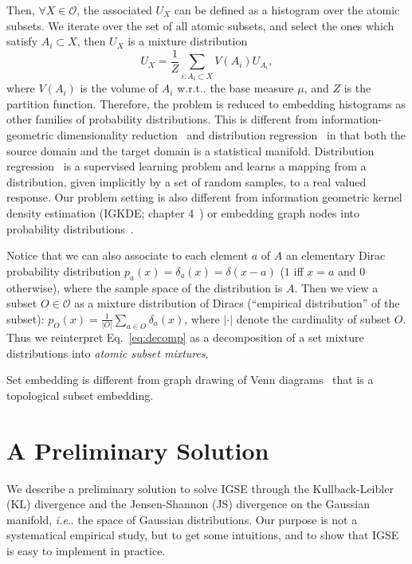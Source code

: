 \documentclass{article}
\makeatletter
\DeclareRobustCommand\onedot{\futurelet\@let@token\bmv@onedotaux}
\def\bmv@onedotaux{\ifx\@let@token.\else.\null\fi\xspace}
\def\ie{\emph{i.e}\onedot} \def\Ie{\emph{I.e}\onedot}
\def\wrt{w.r.t\onedot} \def\Wrt{W.r.t\onedot}
\makeatother
\begin{document}
Then, $\forall{X}\in\mathcal{O}$, the associated $U_X$ can be defined as
a histogram over the atomic subsets. We iterate over the set of all
atomic subsets, and select the ones which satisfy $A_i\subset{X}$,
then $U_X$ is a mixture distribution
\begin{equation}\label{eq:decomp}
U_{X} = \frac{1}{Z} \sum_{i:A_i\subset{X}} V(A_i) U_{A_i},
\end{equation}
where $V(A_i)$ is the volume of $A_i$ \wrt the base measure $\mu$,
and $Z$ is the partition function. Therefore, the problem is
reduced to embedding histograms as other families of probability distributions.
This is different from information-geometric dimensionality reduction~\cite{crIGD,phd}
and distribution regression~\cite{distregression} in that both the source domain and
the target domain is a statistical manifold. Distribution
regression~\cite{distregression} is a supervised learning problem
and learns a mapping from a distribution, given implicitly by a set of random samples,
to a real valued response. Our problem setting is also different from information geometric kernel density estimation
(IGKDE; chapter 4~\cite{phd}) or embedding graph nodes into probability distributions~\cite{gauss}.

Notice that we can also associate to each element $a$ of $A$ an elementary Dirac probability distribution $p_a(x)=\delta_a(x)=\delta(x-a)$ ($1$ iff $x=a$ and $0$ otherwise), where the sample space of the distribution is $A$.
Then we view  a subset  $O\in\mathcal{O}$ as a mixture distribution of Diracs (``empirical distribution'' of the subset): $p_O(x)=\frac{1}{|O|} \sum_{a\in O} \delta_a(x)$, where $|\cdot|$ denote the cardinality of subset $O$.
Thus we reinterpret Eq.~\ref{eq:decomp} as a decomposition of a set mixture distributions into {\em atomic subset mixtures}.

Set embedding is different from graph drawing of Venn diagrams~\cite{VennDiagram-2003} that is a topological subset embedding.

\section{A Preliminary Solution}
We describe a preliminary solution to solve IGSE through the Kullback-Leibler
(KL) divergence and the Jensen-Shannon (JS) divergence on the Gaussian manifold,
\ie the space of Gaussian distributions.
Our purpose is not a systematical empirical study, but to get some intuitions,
and to show that IGSE is easy to implement in practice.
\end{document}
